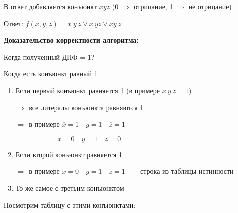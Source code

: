 \documentclass[russian]{lecture-notes}
\begin{document}
\begin{sloppypar}
        В ответ добавляется конъюнкт $xyz$ (0 $\Rightarrow$ отрицание, 1 $\Rightarrow$ не отрицание)

        Ответ: $f(x, y, z) = \overline{x} \: y \: \overline{z} \lor \overline{x} \: yz \lor xy \: \overline{z}$

        \textbf{Доказательство корректности алгоритма:}

        Когда полученный ДНФ = 1?

        Когда есть конъюнкт равный 1

        \begin{enumerate}
            \item{
                Если первый конъюнкт равняется 1 (в примере    $\overline{x} \: y \: \overline{z}  = 1)$

                $\Rightarrow $ все литералы конъюнкта равняются 1

                $\Rightarrow$ в примере $\overline{x} = 1 \quad y = 1 \quad \overline{z} = 1$

                $ \qquad \qquad \qquad x = 0 \quad y = 1 \quad z = 0$
            }
            \item{
                Если второй конъюнкт равняется 1

                $\Rightarrow$ в примере $x = 0 \quad y = 1 \quad z = 1$ ~--- строка из таблицы истинности
            }
            \item{
                То же самое с третьим конъюнктом
            }
        \end{enumerate}

        Посмотрим таблицу с этими конъюнктами:


\end{sloppypar}
\end{document}
